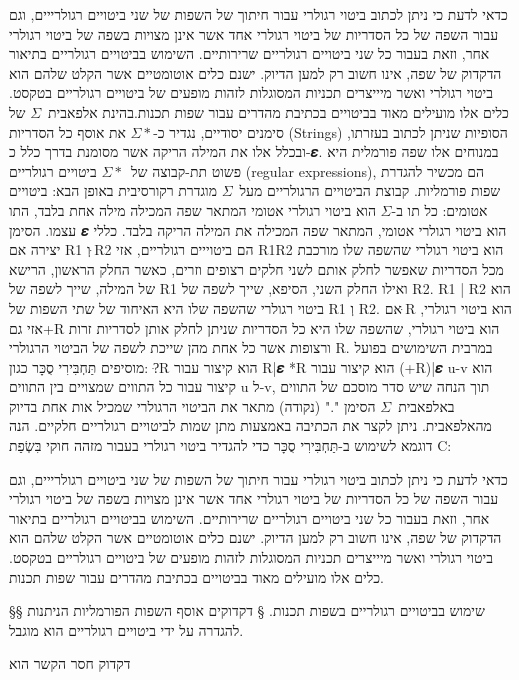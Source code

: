 כדאי לדעת כי ניתן לכתוב ביטוי רגולרי עבור חיתוך של השפות של שני ביטויים
רגולרייים, וגם עבור השפה של כל הסדריות של ביטוי רגולרי אחד אשר אינן מצויות בשפה
של ביטוי רגולרי אחר, וזאת בעבור כל שני ביטויים רגולריים שרירותיים. השימוש
בביטויים רגולריים בתיאור הדקדוק של שפה, אינו חשוב רק למען הדיוק. ישנם כלים
אוטומטיים אשר הקלט שלהם הוא ביטוי רגולרי ואשר מיייצרים תכניות המסוגלות לזהות
מופעים של ביטויים רגולריים בטקסט. כלים אלו מועילים מאוד בביטויים בכתיבת מהדרים
עבור שפות תכנות.בהינת אלפאבית~$Σ$ של סימנים יסודיים, נגדיר כ-$Σ*$ את אוסף כל
הסדריות (Strings) הסופיות שניתן לכתוב בעזרתו, ובכלל אלו את המילה הריקה אשר
מסומנת בדרך כלל כ-𝜺. במנוחים אלו שפה פורמלית היא פשוט תת-קבוצה של~$Σ*$ ביטויים
רגולריים (regular expressions), הם מכשיר להגדרת שפות פורמליות. קבוצת הביטויים
הרגולריים מעל~$Σ$ מוגדרת רקורסיבית באופן הבא:
ביטויים אטומים:
כל תו ב-$Σ$ הוא ביטוי רגולרי אטומי המתאר שפה המכילה מילה אחת בלבד, התו עצמו.
הסימן 𝜺 הוא ביטוי רגולרי אטומי, המתאר שפה המכילה את המילה הריקה בלבד.
כללי יצירה
אם R1 וְ ּR2 הם ביטוייים רגולריים, אזי
R1R2 הוא ביטוי רגולרי שהשפה שלו מורכבת מכל הסדריות שאפשר לחלק אותם לשני חלקים
רצופים וזרים, כאשר החלק הראשון, הרישא של המילה, שייך לשפה של R1 ואילו החלק
השני, הסיפא, שייך לשפה של R2. R1 | R2 הוא ביטוי רגולרי שהשפה שלו היא האיחוד של
שתי השפות של R1 וְ R2.
אם ּR הוא ביטוי רגולרי, אזי גם+R הוא ביטוי רגולרי, שהשפה שלו היא כל הסדריות שניתן לחלק אותן לסדריות זרות ורצופות אשר כל אחת מהן שייכת לשפה של הביטוי הרגולרי R.
במרבית השימושים בפועל מוסיפים תַּחְבִּירִי סֻכָּר כגון:
?ּR הוא קיצור עבור R|𝜺
*R הוא קיצור עבור (+R)|𝜺
u-v הוא קיצור עבור כל התווים שמצויים בין התווים u ל-v, תוך הנחה שיש סדר מוסכם של התווים באלפאבית~$Σ$
הסימן "." (נקודה) מתאר את הביטוי הרגולרי שמכיל אות אחת בדיוק מהאלפאבית.
ניתן לקצר את הכתיבה באמצעות מתן שמות לביטויים רגולריים חלקיים.
הנה דוגמא לשימוש ב-תַּחְבִּירִי סֻכָּר כדי להגדיר ביטוי רגולרי בעבור מזהה חוקי בִּשְׂפַת C:

כדאי לדעת כי ניתן לכתוב ביטוי רגולרי עבור חיתוך של השפות של שני ביטויים
רגולרייים, וגם עבור השפה של כל הסדריות של ביטוי רגולרי אחד אשר אינן מצויות בשפה
של ביטוי רגולרי אחר, וזאת בעבור כל שני ביטויים רגולריים שרירותיים. השימוש
בביטויים רגולריים בתיאור הדקדוק של שפה, אינו חשוב רק למען הדיוק. ישנם כלים
אוטומטיים אשר הקלט שלהם הוא ביטוי רגולרי ואשר מיייצרים תכניות המסוגלות לזהות
מופעים של ביטויים רגולריים בטקסט. כלים אלו מועילים מאוד בביטויים בכתיבת מהדרים
עבור שפות תכנות.

§§ שימוש בביטויים רגולריים בשפות תכנות.
§ דקדוקים
אוסף השפות הפורמליות הניתנות להגדרה על ידי ביטויים רגולריים הוא מוגבל.

דקדוק חסר הקשר הוא

